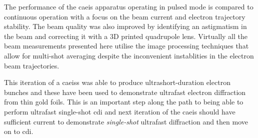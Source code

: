 The performance of the \gls{caeis} apparatus operating in pulsed mode is compared to continuous operation with a focus on the beam current and electron trajectory stability.
The beam quality was also improved by identifying an astigmatism in the beam and correcting it with a 3D printed quadrupole lens.
Virtually all the beam measurements presented here utilise the image processing techniques that allow for multi-shot averaging despite the inconvenient instablities in the electron beam trajectories.

This iteration of a \glspl{caeis} was able to produce ultrashort-duration electron bunches and these have been used to demonstrate ultrafast electron diffraction from thin gold foils.
This is an important step along the path to being able to perform ultrafast single-shot \gls{cdi} and next iteration of the \gls{caeis} should have sufficient current to demonstrate \emph{single-shot} ultrafast diffraction and then move on to \gls{cdi}.